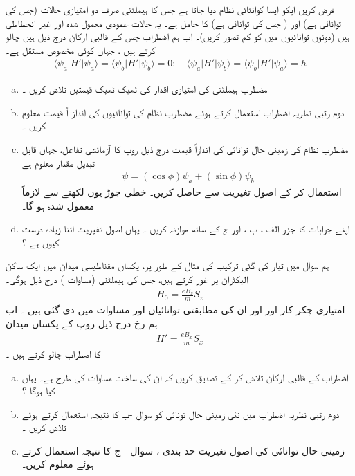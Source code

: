 فرض کریں آپکو   ایسا کوانٹائی نظام دیا جاتا ہے جس کا ہیملٹنی  صرف دو امتیازی حالات   (جس کی توانائی  ہے)  اور  ( جس کی توانائی  ہے)  کا حامل ہے۔ یہ  حالات عمودی معمول شدہ اور غیر انحطاطی ہیں (دونوں توانائیوں میں  کو کم تصور کریں)۔ اب ہم اضطراب   جس کے قالبی ارکان درج ذیل ہیں   چالو کرتے ہیں  ،  جہاں   کوئی مخصوص مستقل ہے۔
\begin{align}\label{مساوات_تغیریت_قالبی_ارکان_دیے_گئے}
\langle \psi_{a}|H'|\psi_{a}\rangle=\langle \psi_{b}|H'|\psi_{b}\rangle=0; \quad \langle \psi_{a}|H'|\psi_{b}\rangle=\langle \psi_{b}|H'|\psi_{a}\rangle=h
\end{align}
\begin{enumerate}[a.]
\item
 مضطرب ہیملٹنی کی امتیازی اقدار کی ٹھیک ٹھیک قیمتیں تلاش کریں ۔
\item
دوم   رتبی نظریہ اضطراب استعمال کرتے ہوئے مضطرب نظام کی توانائیوں کی انداز اً  قیمت معلوم کریں ۔
\item
 مضطرب نظام کی زمینی حال  توانائی کی اندازاً  قیمت درج ذیل روپ کا آزمائشی  تفاعل،   جہاں  قابل تبدیل مقدار معلوم ہے 
\begin{align}
\psi=(\cos{\phi})\psi_{a}+(\sin{\phi})\psi_{b} 
\end{align}
 استعمال کر کے اصول تغیریت سے حاصل کریں۔  خطی جوڑ یوں لکھنے سے   لازماً معمول شدہ  ہو گا۔
\item
 اپنے جوابات کا جزو  الف ، ب ، اور ج کے ساتھ موازنہ کریں ۔ یہاں اصول تغیریت اتنا زیادہ درست کیوں ہے ؟
 \end{enumerate}
ہم سوال   میں تیار کی گئی ترکیب کی  مثال کے طور پر،  یکساں مقناطیسی میدان  میں ایک ساکن الیکٹران پر غور کرتے ہیں، جس کی ہیملٹنی  (مساوات )  درج ذیل ہوگی۔
\begin{align}
H_{0}=\frac{eB_{z}}{m}S_{z} 
\end{align}
 امتیازی چکر کار  اور  اور ان  کی مطابقتی توانائیاں  اور    مساوات   میں دی گئی ہیں ۔ اب ہم    رخ درج ذیل روپ  کے  یکساں میدان
\begin{align}
H'=\frac{eB_{x}}{m}S_{x} 
\end{align}
 کا  اضطراب  چالو کرتے ہیں ۔
 \begin{enumerate}[a.]
\item
 اضطراب  کے قالبی ارکان تلاش کر کے تصدیق کریں کہ ان کی ساخت مساوات    کی  طرح ہے۔  یہاں   کیا ہوگا ؟
\item
 دوم رتبی نظریہ اضطراب میں نئی زمینی حال تونائی کو سوال  -ب   کا نتیجہ  استعمال کرتے ہوئے تلاش کریں ۔
\item
 زمینی حال توانائی کی اصول تغیریت حد بندی ،  سوال - ج   کا نتیجہ استعمال کرتے ہوئے معلوم کریں۔
 \end{enumerate}
